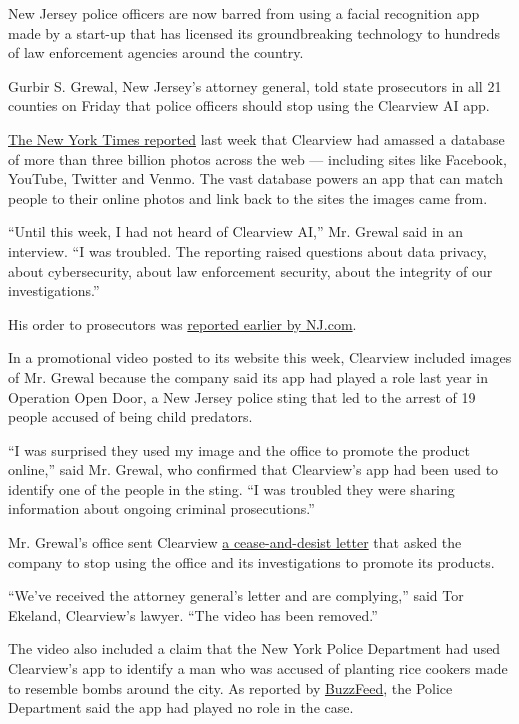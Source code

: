 New Jersey police officers are now barred from using a facial
recognition app made by a start-up that has licensed its groundbreaking
technology to hundreds of law enforcement agencies around the country.

Gurbir S. Grewal, New Jersey's attorney general, told state prosecutors
in all 21 counties on Friday that police officers should stop using the
Clearview AI app.

\href{https://www.nytimes.com/2020/01/18/technology/clearview-privacy-facial-recognition.html}{The
New York Times reported} last week that Clearview had amassed a database
of more than three billion photos across the web --- including sites
like Facebook, YouTube, Twitter and Venmo. The vast database powers an
app that can match people to their online photos and link back to the
sites the images came from.

``Until this week, I had not heard of Clearview AI,'' Mr. Grewal said in
an interview. ``I was troubled. The reporting raised questions about
data privacy, about cybersecurity, about law enforcement security, about
the integrity of our investigations.''

His order to prosecutors was
\href{https://www.nj.com/news/2020/01/new-jersey-cops-told-to-halt-all-use-of-controversial-facial-recognition-technology.html}{reported
earlier by NJ.com}.

In a promotional video posted to its website this week, Clearview
included images of Mr. Grewal because the company said its app had
played a role last year in Operation Open Door, a New Jersey police
sting that led to the arrest of 19 people accused of being child
predators.

``I was surprised they used my image and the office to promote the
product online,'' said Mr. Grewal, who confirmed that Clearview's app
had been used to identify one of the people in the sting. ``I was
troubled they were sharing information about ongoing criminal
prosecutions.''

Mr. Grewal's office sent Clearview
\href{https://int.nyt.com/data/documenthelper/6726-new-jersey-ag-clearview-cease-/07b7d49c8810740df2cb/optimized/full.pdf\#page=1}{a
cease-and-desist letter} that asked the company to stop using the office
and its investigations to promote its products.

``We've received the attorney general's letter and are complying,'' said
Tor Ekeland, Clearview's lawyer. ``The video has been removed.''

The video also included a claim that the New York Police Department had
used Clearview's app to identify a man who was accused of planting rice
cookers made to resemble bombs around the city. As reported by
\href{https://www.buzzfeednews.com/article/ryanmac/clearview-ai-nypd-facial-recognition}{BuzzFeed},
the Police Department said the app had played no role in the case.

